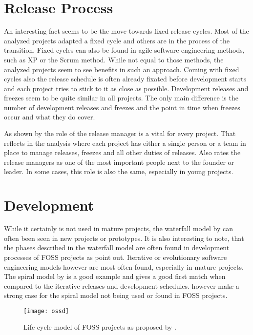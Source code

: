 
\section{Release Process} %

An interesting fact seems to be the move towards fixed release cycles. Most of
the analyzed projects adapted a fixed cycle and others are in the process of
the transition. Fixed cycles can also be found in agile software engineering
methods, such as \acl{XP} or the Scrum method. While not equal to those
methods, the analyzed projects seem to see benefits in such an approach. Coming
with fixed cycles also the release schedule is often already fixated before
development starts and each project tries to stick to it as close as possible.
Development releases and freezes seem to be quite similar in all projects. The
only main difference is the number of development releases and freezes and the
point in time when freezes occur and what they do cover.

As shown by \textcite{Mockus2002} the role of the release manager is a vital
for every project. That reflects in the analysis where each project has either
a single person or a team in place to manage releases, freezes and all other
duties of releases. Also \textcite{Crowston2005} rates the release managers as
one of the most important people next to the founder or leader. In some cases,
this role is also the same, especially in young projects.


\section{Development} %

While it certainly is not used in mature projects, the waterfall model by
\textcite{Royce1970} can often been seen in new projects or prototypes. It is
also interesting to note, that the phases described in the waterfall model are
often found in development processes of \ac{FOSS} projects as
\textcite{Roets2007} point out. Iterative or evolutionary software engineering
models however are most often found, especially in mature projects. The spiral
model by \textcite{Boehm1988} is a good example and gives a good first match
when compared to the iterative releases and development schedules.
\textcite{Roets2007} however make a strong case for the spiral model not being
used or found in \ac{FOSS} projects.

\begin{figure}[htbp]
  \centering
  \texttt{[image: ossd]}
  \caption{Life cycle model of \acl{FOSS} projects as proposed by \textcite{Roets2007}.}
\end{figure}

